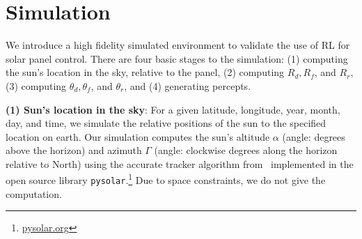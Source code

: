 \documentclass{article}
\begin{document}
%

\section{Simulation}
\label{sec:simulation}

We introduce a high fidelity simulated environment to validate the use of RL for solar panel control. There are four basic stages to the simulation: (1) computing the sun's location in the sky, relative to the panel, (2) computing $R_d, R_f$, and $R_r$, (3) computing $\theta_d, \theta_f$, and $\theta_r$, and (4) generating percepts.

{\bf (1) Sun's location in the sky}: For a given latitude, longitude, year, month, day, and time, we simulate the relative positions of the sun to the specified location on earth. Our simulation computes the sun's altitude $\alpha$ (angle: degrees above the horizon) and azimuth $\Gamma$ (angle: clockwise degrees along the horizon relative to North) using the accurate tracker algorithm from~\citet{reda2004solar} implemented in the open source library \texttt{pysolar}.\footnote{\url{pysolar.org}} Due to space constraints, we do not give the computation. %
\end{document}
